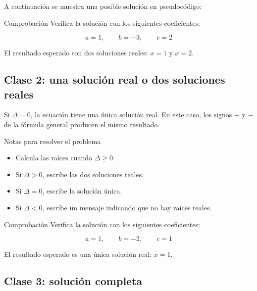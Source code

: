 \documentclass[
  spanish,
  11pt,
  a4paper,
  DIV=11,
  numbers=noendperiod]{scrartcl}
\providecommand{\tightlist}{\setlength{\itemsep}{0pt}\setlength{\parskip}{0pt}}
\begin{document}
A continuación se muestra una posible solución en pseudocódigo:


\begin{PracticeTipBox}{Comprobación}
Verifica la solución con los siguientes coeficientes:

\[
a=1,\qquad b=-3,\qquad c=2
\]

El resultado esperado son dos soluciones reales: \(x=1\) y \(x=2\).
\end{PracticeTipBox}

\subsection{Clase 2: una solución real o dos soluciones reales}\label{clase-2-una-solucion-real-o-dos-soluciones-reales}

Si \(\Delta = 0\), la ecuación tiene una única solución real. En este caso, los signos \(+\) y \(-\) de la fórmula general producen el mismo resultado.

\begin{PracticeNoteBox}{Notas para resolver el problema}
\begin{itemize}
\tightlist
\item Calcula las raíces cuando \(\Delta \geq 0\).
\item Si \(\Delta > 0\), escribe las dos soluciones reales.
\item Si \(\Delta = 0\), escribe la solución única.
\item Si \(\Delta < 0\), escribe un mensaje indicando que no hay raíces reales.
\end{itemize}
\end{PracticeNoteBox}


\begin{PracticeTipBox}{Comprobación}
Verifica la solución con los siguientes coeficientes:

\[
a=1,\qquad b=-2,\qquad c=1
\]

El resultado esperado es una única solución real: \(x=1\).
\end{PracticeTipBox}

\subsection{Clase 3: solución completa}\label{clase-3-solucion-completa}
\end{document}
